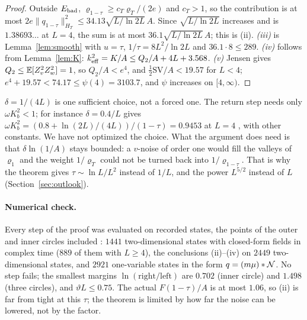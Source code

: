 \begin{proof}
Outside $E_{\rm bad}$, $\varrho_{1-\tau}\ge c_T\varrho_T/(2e)$ and $c_T>1$, so the contribution is at most $2e\|q_{1-\tau}\|^2_{H_T}\le34.13\sqrt{L/\ln2L}\,A$.
Since $\sqrt{L/\ln2L}$ increases and is $1.38693\ldots$ at $L=4$, the sum is at most $36.1\sqrt{L/\ln2L}\,A$; this is (ii).
\emph{(iii)} is Lemma~\ref{lem:smooth} with $u=\tau$, $1/\tau=8L^2/\ln2L$ and $36.1\cdot8\le289$.
\emph{(iv)} follows from Lemma~\ref{lem:K}: $k_{\mathrm{eff}}^2=K/A\le Q_2/A+4L+3.568$.
\emph{(v)} Jensen gives $Q_2\le\mathbb{E}[Z_v^2Z_w^2]=1$, so $Q_2/A<e^4$, and $\frac12\mathrm{SV}/A<19.57$ for $L<4$; $e^4+19.57<74.17\le\psi(4)=3103.7$, and $\psi$ increases on $[4,\infty)$.
\end{proof}

\begin{remark}\label{rem:delta}
$\delta=1/(4L)$ is one sufficient choice, not a forced one.
The return step needs only $\omega K_b^2<1$; for instance $\delta=0.4/L$ gives $\omega K_b^2=(0.8+\ln(2L)/(4L))/(1-\tau)=0.9453$ at $L=4$ \proofst, with other constants.
We have not optimized the choice.
What the argument does need is that $\delta\ln(1/A)$ stays bounded: a $v$-noise of order one would fill the valleys of $\varrho_1$ and the weight $1/\varrho_T$ could not be turned back into $1/\varrho_{1-\tau}$.
That is why the theorem gives $\tau\sim\ln L/L^2$ instead of $1/L$, and the power $L^{5/2}$ instead of $L$ (Section~\ref{sec:outlook}).
\end{remark}

\paragraph*{Numerical check.}
Every step of the proof was evaluated on recorded states, the points of the outer and inner circles included \numst: $1441$ two-dimensional states with closed-form fields in complex time ($889$ of them with $L\ge4$), the conclusions (ii)--(iv) on $2449$ two-dimensional states, and $2921$ one-variable states in the form $q=(m\mu)*\mathcal N$.
No step fails; the smallest margins $\ln(\text{right}/\text{left})$ are $0.702$ (inner circle) and $1.498$ (three circles), and $\vartheta L\le0.75$.
The actual $F(1-\tau)/A$ is at most $1.06$, so (ii) is far from tight at this $\tau$; the theorem is limited by how far the noise can be lowered, not by the factor.
